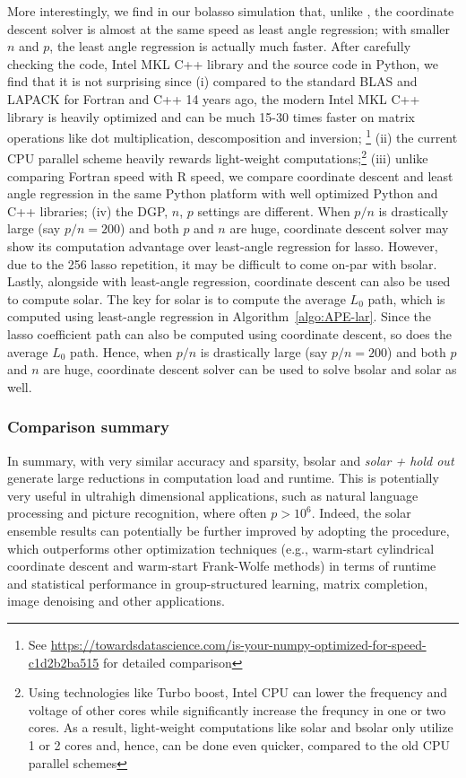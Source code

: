 \documentclass[12pt]{article}
\begin{document}
More interestingly, we find in our bolasso simulation that, unlike \citet{friedman2007pathwise}, the coordinate descent solver is almost at the same speed as least angle regression; with smaller $n$ and $p$, the least angle regression is actually much faster. After carefully checking the code, Intel MKL C++ library and the source code in Python, we find that it is not surprising since (i) compared to the standard BLAS and LAPACK for Fortran and C++ 14 years ago, the modern Intel MKL C++ library is heavily optimized and can be much 15-30 times faster on matrix operations like dot multiplication, descomposition and inversion; \footnote{ See \url{https://towardsdatascience.com/is-your-numpy-optimized-for-speed-c1d2b2ba515} for detailed comparison} (ii) the current CPU parallel scheme heavily rewards light-weight computations;\footnote{ Using technologies like Turbo boost, Intel CPU can lower the frequency and voltage of other cores while significantly increase the frequncy in one or two cores. As a result, light-weight computations like solar and bsolar only utilize 1 or 2 cores and, hence, can be done even quicker, compared to the old CPU parallel schemes} (iii) unlike \citet{friedman2007pathwise} comparing Fortran speed with R speed, we compare coordinate descent and least angle regression in the same Python platform with well optimized Python and C++ libraries; (iv) the DGP, $n$, $p$ settings are different. When $p/n$ is drastically large (say $p/n=200$) and both $p$ and $n$ are huge, coordinate descent solver may show its computation advantage over least-angle regression for lasso. However, due to the 256 lasso repetition, it may be difficult to come on-par with bsolar. Lastly, alongside with least-angle regression, coordinate descent can also be used to compute solar. The key for solar is to compute the average $L_0$ path, which is computed using least-angle regression in Algorithm~\ref{algo:APE-lar}. Since the lasso coefficient path can also be computed using coordinate descent, so does the average $L_0$ path. Hence, when $p/n$ is drastically large (say $p/n=200$) and both $p$ and $n$ are huge, coordinate descent solver can be used to solve bsolar and solar as well.

\subsubsection*{Comparison summary}

In summary, with very similar accuracy and sparsity, bsolar and \emph{solar + hold out} generate large reductions in computation load and runtime. This is potentially very useful in ultrahigh dimensional applications, such as natural language processing and picture recognition, where often $p>10^6$. Indeed, the solar ensemble results can potentially be further improved by adopting the \cite{tibshirani2015general} procedure, which outperforms other optimization techniques (e.g., warm-start cylindrical coordinate descent and warm-start Frank-Wolfe methods) in terms of runtime and statistical performance in group-structured learning, matrix completion, image denoising and other applications.
\end{document}
